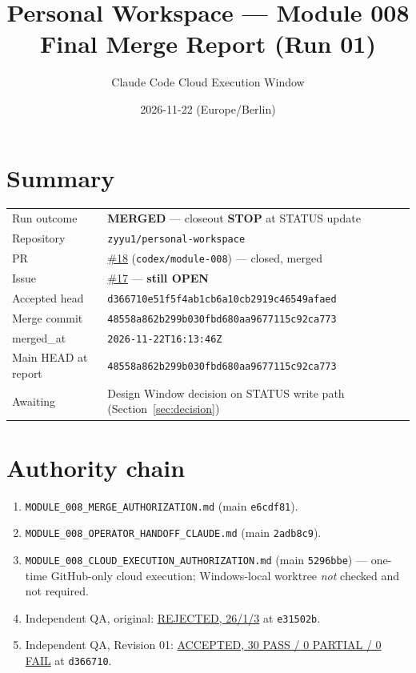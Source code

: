 \documentclass[11pt,a4paper]{article}
\title{Personal Workspace --- Module 008\\Final Merge Report (Run 01)}
\author{Claude Code Cloud Execution Window}
\date{2026-11-22 (Europe/Berlin)}
\newcommand{\sha}[1]{\texttt{\small #1}}
\newcommand{\STOP}{\textcolor{red!70!black}{\textbf{STOP}}}
\begin{document}
\maketitle

\section*{Summary}
\begin{tabularx}{\textwidth}{@{}lX@{}}
\toprule
Run outcome & \textbf{MERGED} --- closeout \STOP{} at STATUS update \\
Repository & \texttt{zyyu1/personal-workspace} \\
PR & \href{https://github.com/zyyu1/personal-workspace/pull/18}{\#18} (\texttt{codex/module-008}) --- closed, merged \\
Issue & \href{https://github.com/zyyu1/personal-workspace/issues/17}{\#17} --- \textbf{still OPEN} \\
Accepted head & \sha{d366710e51f5f4ab1cb6a10cb2919c46549afaed} \\
Merge commit & \sha{48558a862b299b030fbd680aa9677115c92ca773} \\
merged\_at & \texttt{2026-11-22T16:13:46Z} \\
Main HEAD at report & \sha{48558a862b299b030fbd680aa9677115c92ca773} \\
Awaiting & Design Window decision on STATUS write path (Section~\ref{sec:decision}) \\
\bottomrule
\end{tabularx}

\section{Authority chain}
\begin{enumerate}[nosep]
  \item \texttt{MODULE\_008\_MERGE\_AUTHORIZATION.md} (main \sha{e6cdf81}).
  \item \texttt{MODULE\_008\_OPERATOR\_HANDOFF\_CLAUDE.md} (main \sha{2adb8c9}).
  \item \texttt{MODULE\_008\_CLOUD\_EXECUTION\_AUTHORIZATION.md} (main \sha{5296bbe}) --- one-time GitHub-only cloud execution; Windows-local worktree \emph{not} checked and not required.
  \item Independent QA, original: \href{https://github.com/zyyu1/personal-workspace/pull/18\#issuecomment-7069366299}{REJECTED, 26/1/3} at \sha{e31502b}.
  \item Independent QA, Revision 01: \href{https://github.com/zyyu1/personal-workspace/pull/18\#issuecomment-7069684532}{ACCEPTED, 30 PASS / 0 PARTIAL / 0 FAIL} at \sha{d366710}.
\end{enumerate}
\end{document}
